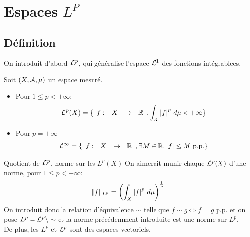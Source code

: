 \documentclass[]{report}
\begin{document}
\chapter{Espaces $L^P$}

\section{Définition}

On introduit d'abord $\mathcal{L}^p$, qui généralise l'espace $\mathcal{L}^1$ des fonctions intégrablees.

\begin{df}{}{}
    Soit $(X,\mathcal{A},\mu)$ un espace mesuré.
    \begin{itemize}
        \item Pour $1\le p < +\infty$:
        \[\mathcal{L}^p ( X)=\{\begin{array}{ccccc} f : & X & \to & \mathbb{R} \end{array},\int_X \left|f\right|^p\, d\mu < +\infty\}\]
        \item Pour $p=+\infty$
        \[\mathcal{L}^\infty=\{\begin{array}{ccccc} f : & X & \to & \mathbb{R} \end{array},\exists M\in \mathbb{R},\left|f\right|\le M \text{ p.p.}\}\]
    \end{itemize}
\end{df}

\begin{prop}{Quotient de $\mathcal{L}^p$, norme sur les $L^p(X)$}{}
    On aimerait munir chaque $\mathcal{L}^p(X)$ d'une norme, pour $1\le p<+\infty$:
    \[\lVert f \rVert_{L^p}=\left(\int_X \left|f\right|^p\, d\mu\right)^{\frac{1}{p}}\]
    On introduit donc la relation d'équivalence $\sim$ telle que $f\sim g\iff f=g$ p.p. et on pose $L^p=\mathcal{L}^p\backslash\sim$ et la norme précédemment introduite est une norme sur $L^p$.\\
    De plus, les $L^p$ et $\mathcal{L}^p$ sont des espaces vectoriels.
\end{prop}
\end{document}
